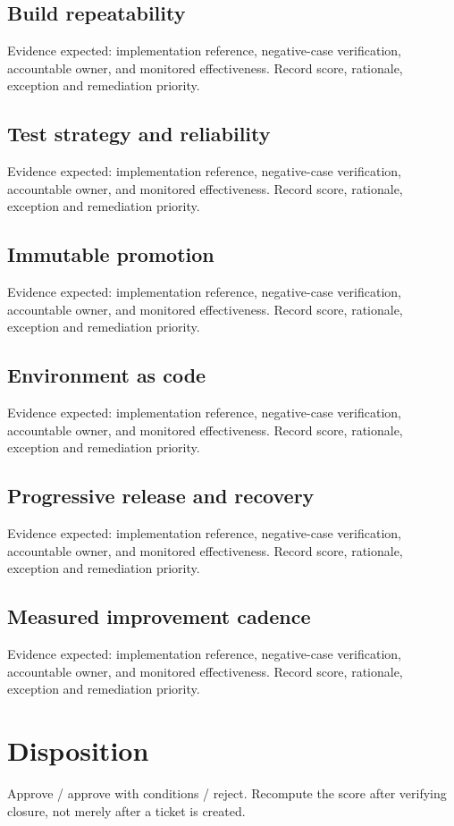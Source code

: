 \documentclass[10pt,letterpaper]{article}
\begin{document}
\subsection{Build repeatability}
Evidence expected: implementation reference, negative-case verification, accountable owner, and monitored effectiveness. Record score, rationale, exception and remediation priority.


\subsection{Test strategy and reliability}
Evidence expected: implementation reference, negative-case verification, accountable owner, and monitored effectiveness. Record score, rationale, exception and remediation priority.


\subsection{Immutable promotion}
Evidence expected: implementation reference, negative-case verification, accountable owner, and monitored effectiveness. Record score, rationale, exception and remediation priority.


\subsection{Environment as code}
Evidence expected: implementation reference, negative-case verification, accountable owner, and monitored effectiveness. Record score, rationale, exception and remediation priority.


\subsection{Progressive release and recovery}
Evidence expected: implementation reference, negative-case verification, accountable owner, and monitored effectiveness. Record score, rationale, exception and remediation priority.


\subsection{Measured improvement cadence}
Evidence expected: implementation reference, negative-case verification, accountable owner, and monitored effectiveness. Record score, rationale, exception and remediation priority.


\section{Disposition}
Approve / approve with conditions / reject. Recompute the score after verifying closure, not merely after a ticket is created.
\end{document}
